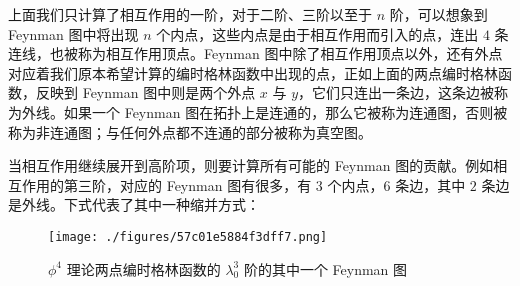 上面我们只计算了相互作用的一阶，对于二阶、三阶以至于 $n$ 阶，可以想象到 Feynman 图中将出现 $n$ 个内点，这些内点是由于相互作用而引入的点，连出 $4$ 条连线，也被称为相互作用顶点。Feynman 图中除了相互作用顶点以外，还有外点对应着我们原本希望计算的编时格林函数中出现的点，正如上面的两点编时格林函数，反映到 Feynman 图中则是两个外点 $x$ 与 $y$，它们只连出一条边，这条边被称为外线。如果一个 Feynman 图在拓扑上是连通的，那么它被称为连通图，否则被称为非连通图；与任何外点都不连通的部分被称为真空图。

当相互作用继续展开到高阶项，则要计算所有可能的 Feynman 图的贡献。例如相互作用的第三阶，对应的 Feynman 图有很多，有 $3$ 个内点，$6$ 条边，其中 $2$ 条边是外线。下式代表了其中一种缩并方式：
\begin{figure}[ht]
\centering
\texttt{[image: ./figures/57c01e5884f3dff7.png]}
\caption{$\phi^4$ 理论两点编时格林函数的 $\lambda_0^3$ 阶的其中一个 Feynman 图} \label{fig_wick2}
\end{figure}

